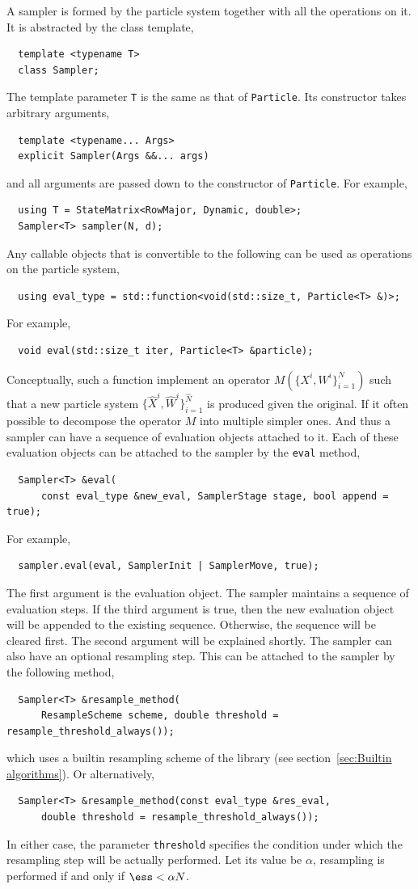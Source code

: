 A sampler is formed by the particle system together with all the operations on
it. It is abstracted by the class template,
\begin{Verbatim}
  template <typename T>
  class Sampler;
\end{Verbatim}
The template parameter \verb|T| is the same as that of \verb|Particle|. Its
constructor takes arbitrary arguments,
\begin{Verbatim}
  template <typename... Args>
  explicit Sampler(Args &&... args)
\end{Verbatim}
and all arguments are passed down to the constructor of \verb|Particle|. For
example,
\begin{Verbatim}
  using T = StateMatrix<RowMajor, Dynamic, double>;
  Sampler<T> sampler(N, d);
\end{Verbatim}
Any callable objects that is convertible to the following can be used as
operations on the particle system,
\begin{Verbatim}
  using eval_type = std::function<void(std::size_t, Particle<T> &)>;
\end{Verbatim}
For example,
\begin{Verbatim}
  void eval(std::size_t iter, Particle<T> &particle);
\end{Verbatim}
Conceptually, such a function implement an operator $M(\{X^i,W^i\}_{i=1}^N)$
such that a new particle system $\{\hat{X}^i,\hat{W}^i\}_{i=1}^{\hat{N}}$ is
produced given the original. If it often possible to decompose the operator $M$
into multiple simpler ones. And thus a sampler can have a sequence of
evaluation objects attached to it. Each of these evaluation objects can be
attached to the sampler by the \verb|eval| method,
\begin{Verbatim}
  Sampler<T> &eval(
      const eval_type &new_eval, SamplerStage stage, bool append = true);
\end{Verbatim}
For example,
\begin{Verbatim}
  sampler.eval(eval, SamplerInit | SamplerMove, true);
\end{Verbatim}
The first argument is the evaluation object. The sampler maintains a sequence
of evaluation steps. If the third argument is true, then the new evaluation
object will be appended to the existing sequence. Otherwise, the sequence will
be cleared first. The second argument will be explained shortly. The sampler
can also have an optional resampling step. This can be attached to the sampler
by the following method,
\begin{Verbatim}
  Sampler<T> &resample_method(
      ResampleScheme scheme, double threshold = resample_threshold_always());
\end{Verbatim}
which uses a builtin resampling scheme of the library (see
section~\ref{sec:Builtin algorithms}). Or alternatively,
\begin{Verbatim}
  Sampler<T> &resample_method(const eval_type &res_eval,
      double threshold = resample_threshold_always());
\end{Verbatim}
In either case, the parameter \verb|threshold| specifies the condition under
which the resampling step will be actually performed. Let its value be
$\alpha$, resampling is performed if and only if $\ess < \alpha N$.

